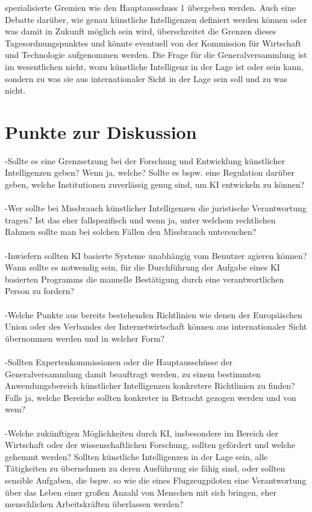 \documentclass[a4paper,11pt]{article}
\begin{document}
spezialisierte Gremien wie den Hauptausschuss 1 übergeben werden. Auch eine Debatte darüber, wie genau künstliche Intelligenzen definiert werden können oder was damit in Zukunft möglich sein wird, überschreitet die Grenzen dieses Tagesordnungspunktes und könnte eventuell von der Kommission für Wirtschaft und Technologie aufgenommen werden. Die Frage für die Generalversammlung ist im wesentlichen nicht, wozu künstliche Intelligenz in der Lage ist oder sein kann, sondern zu was sie aus internationaler Sicht in der Lage sein soll und zu was nicht.

  \newpage
      
    \section{Punkte zur Diskussion}

-Sollte es eine Grenzsetzung bei der Forschung und Entwicklung künstlicher Intelligenzen geben? Wenn ja, welche? Sollte es bspw. eine Regulation darüber geben, welche Institutionen zuverlässig genug sind, um KI entwickeln zu können? \\ \\ -Wer sollte bei Missbrauch künstlicher Intelligenzen die juristische Verantwortung tragen? Ist das eher fallspezifisch und wenn ja, unter welchem rechtlichen Rahmen sollte man bei solchen Fällen den Missbrauch untersuchen? \\ \\ -Inwiefern sollten KI basierte Systeme unabhängig vom Benutzer agieren können? Wann sollte es notwendig sein, für die Durchführung der Aufgabe eines KI basierten Programms die manuelle Bestätigung durch eine verantwortlichen Person zu fordern? \\ \\ -Welche Punkte aus bereits bestehenden Richtlinien wie denen der Europäischen Union oder des Verbandes der Internetwirtschaft können aus internationaler Sicht übernommen werden und in welcher Form? \\ \\ -Sollten Expertenkommissionen oder die Hauptausschüsse der Generalversammlung damit beauftragt werden, zu einem bestimmten Anwendungsbereich künstlicher Intelligenzen konkretere Richtlinien zu finden? Falls ja, welche Bereiche sollten konkreter in Betracht gezogen werden und von wem? \\ \\ -Welche zukünftigen Möglichkeiten durch KI, insbesondere im Bereich der Wirtschaft oder der wissenschaftlichen Forschung, sollten gefördert und welche gehemmt werden? Sollten künstliche Intelligenzen in der Lage sein, alle Tätigkeiten zu übernehmen zu deren Ausführung sie fähig sind, oder sollten sensible Aufgaben, die bspw. so wie die eines Flugzeugpiloten eine Verantwortung über das Leben einer großen Anzahl von Menschen mit sich bringen, eher menschlichen Arbeitskräften überlassen werden?
\end{document}
